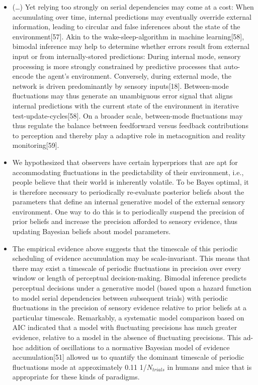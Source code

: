 \documentclass[
]{article}
\begin{document}
\begin{itemize}
\item
  (\ldots) Yet relying too strongly on serial dependencies may come at a
  cost: When accumulating over time, internal predictions may eventually
  override external information, leading to circular and false
  inferences about the state of the environment{[}57{]}. Akin to the
  wake-sleep-algorithm in machine learning{[}58{]}, bimodal inference
  may help to determine whether errors result from external input or
  from internally-stored predictions: During internal mode, sensory
  processing is more strongly constrained by predictive processes that
  auto-encode the agent's environment. Conversely, during external mode,
  the network is driven predominantly by sensory inputs{[}18{]}.
  Between-mode fluctuations may thus generate an unambiguous error
  signal that aligns internal predictions with the current state of the
  environment in iterative test-update-cycles{[}58{]}. On a broader
  scale, between-mode fluctuations may thus regulate the balance between
  feedforward versus feedback contributions to perception and thereby
  play a adaptive role in metacognition and reality monitoring{[}59{]}.
\item
  We hypothesized that observers have certain hyperpriors that are apt
  for accommodating fluctuations in the predictability of their
  environment, i.e., people believe that their world is inherently
  volatile. To be Bayes optimal, it is therefore necessary to
  periodically re-evaluate posterior beliefs about the parameters that
  define an internal generative model of the external sensory
  environment. One way to do this is to periodically suspend the
  precision of prior beliefs and increase the precision afforded to
  sensory evidence, thus updating Bayesian beliefs about model
  parameters.
\item
  The empirical evidence above suggests that the timescale of this
  periodic scheduling of evidence accumulation may be scale-invariant.
  This means that there may exist a timescale of periodic fluctuations
  in precision over every window or length of perceptual
  decision-making. Bimodal inference predicts perceptual decisions under
  a generative model (based upon a hazard function to model serial
  dependencies between subsequent trials) with periodic fluctuations in
  the precision of sensory evidence relative to prior beliefs at a
  particular timescale. Remarkably, a systematic model comparison based
  on AIC indicated that a model with fluctuating precisions has much
  greater evidence, relative to a model in the absence of fluctuating
  precisions. This ad-hoc addition of oscillations to a normative
  Bayesian model of evidence accumulation{[}51{]} allowed us to quantify
  the dominant timescale of periodic fluctuations mode at approximately
  0.11 1/\(N_{trials}\) in humans and mice that is appropriate for these
  kinds of paradigms.
\end{itemize}
\end{document}
